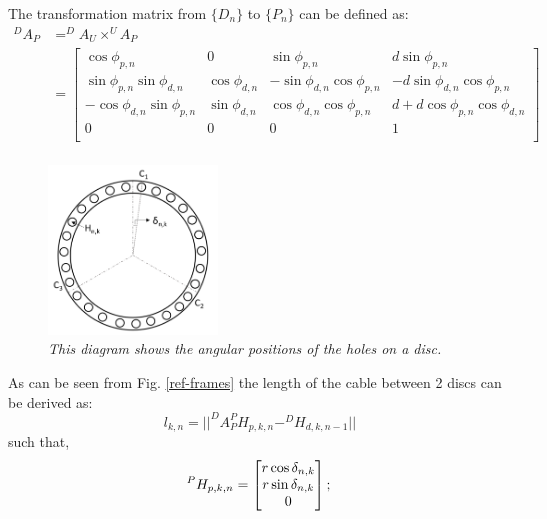\documentclass[a4paper,12pt]{report}
\begin{document}
The transformation matrix from $\{D_n\}$ to $\{P_n\}$ can be defined as: 
\begin{equation}
\begin{aligned}
^DA_P&=^DA_U \times ^UA_P \\ 
&= \begin{bmatrix}
\cos{\phi_{p,n}}&0&\sin{\phi_{p,n}}&d\sin{\phi_{p,n}}\\
\sin{\phi_{p,n}}\sin{\phi_{d,n}}&\cos{\phi_{d,n}}&-\sin{\phi_{d,n}}\cos{\phi_{p,n}}&-d\sin{\phi_{d,n}}\cos{\phi_{p,n}}\\
-\cos{\phi_{d,n}}\sin{\phi_{p,n}}&\sin{\phi_{d,n}}&\cos{\phi_{d,n}}\cos{\phi_{p,n}}&d+d\cos{\phi_{p,n}}\cos{\phi_{d,n}}\\
0&0&0&1\\
\end{bmatrix}\\
\end{aligned}
\end{equation}

\begin{figure}
	\centering
	\vspace{-50pt}
	\includegraphics[width=0.4\textwidth]{images/hole_positions.png}
	\caption{\textit{This diagram shows the angular positions of the holes on a disc.}}
	\label{hole-pos}
\end{figure} 
As can be seen from Fig. \ref{ref-frames} the length of the cable between 2 discs can be derived as:
\begin{equation}
\label{len_joints}
l_{k,n}= \lvert\lvert ^DA_P^PH_{p,k,n} - ^DH_{d,k,n-1}  \rvert\rvert
\end{equation}
such that,
\begin{equation*}
^PH_{p,k,n}=\begin{bmatrix}
r\cos{\delta_{n,k}}\\
r\sin{\delta_{n,k}}\\
0\\
\end{bmatrix};  \\
\end{equation*}
\end{document}
